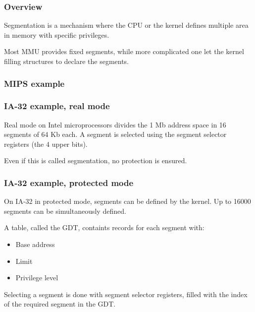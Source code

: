 
\begin{frame}
  \frametitle{Overview}

  Segmentation is a mechanism where the CPU or the kernel defines
  multiple area in memory with specific privileges.

  \-

  Most MMU provides fixed segments, while more complicated one let the
  kernel filling structures to declare the segments.

\end{frame}


\begin{frame}
  \frametitle{MIPS example}

  \begin{center}
  \end{center}

\end{frame}


\begin{frame}
  \frametitle{IA-32 example, real mode}

  Real mode on Intel microprocessors divides the 1 Mb address space in
  16 segments of 64 Kb each. A segment is selected using the segment
  selector registers (the 4 upper bits).

  \-

  Even if this is called segmentation, no protection is ensured.

\end{frame}


\begin{frame}
  \frametitle{IA-32 example, protected mode}

  On IA-32 in protected mode, segments can be defined by the
  kernel. Up to 16000 segments can be simultaneously defined.

  \-

  A table, called the GDT, containts records for each segment with:

  \begin{itemize}
  \item
    Base address
  \item
    Limit
  \item
    Privilege level
  \end{itemize}

  \-

  Selecting a segment is done with segment selector registers, filled
  with the index of the required segment in the GDT.

\end{frame}

